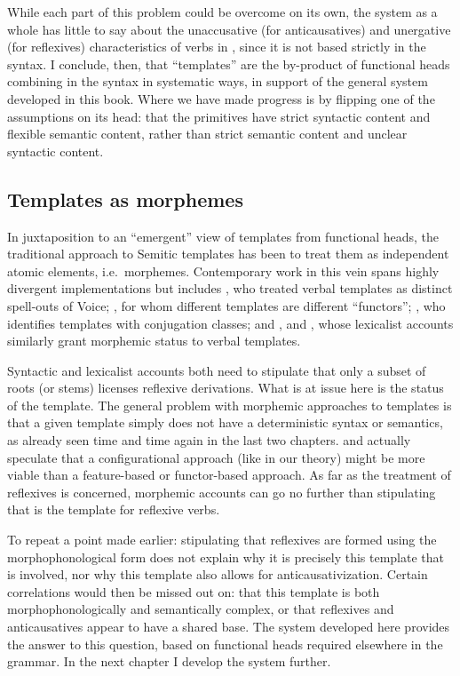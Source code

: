{{While each part of this problem could be overcome on its own, the system as a whole has little to say about the unaccusative (for anticausatives) and unergative (for reflexives) characteristics of verbs in {\thit}, since it is not based strictly in the syntax. I conclude, then, that ``templates'' are the by-product of functional heads combining in the syntax in systematic ways, in support of the general system developed in this book. Where we have made progress is by flipping one of the assumptions on its head: that the primitives have strict syntactic content and flexible semantic content, rather than strict semantic content and unclear syntactic content.

	\subsection{Templates as morphemes} \label{vz:others:morph}
In juxtaposition to an ``emergent'' view of templates from functional heads, the traditional approach to Semitic templates has been to treat them as independent atomic elements, i.e.~morphemes. Contemporary work in this vein spans highly divergent implementations but includes \cite{arad03,arad05}, who treated verbal templates as distinct spell-outs of Voice; \cite{borer13oup}, for whom different templates are different ``functors''; \cite{aronoff94,aronoff07}, who identifies templates with conjugation classes; and \cite{reinhartsiloni05}, \cite{schwarzwald08} and \cite{laks11,laks14}, whose lexicalist accounts similarly grant morphemic status to verbal templates.

Syntactic and lexicalist accounts both need to stipulate that only a subset of roots (or stems) licenses reflexive derivations. What is at issue here is the status of the template. The general problem with morphemic approaches to templates is that a given template simply does not have a deterministic syntax or semantics, as already seen time and time again in the last two chapters. \citet[198]{arad05} and \citet[564]{borer13oup} actually speculate that a configurational approach (like in our theory) might be more viable than a feature-based or functor-based approach. As far as the treatment of reflexives is concerned, morphemic accounts can go no further than stipulating that {\thit} is the template for reflexive verbs.

To repeat a point made earlier: stipulating that reflexives are formed using the morphophonological form {\thit} does not explain why it is precisely this template that is involved, nor why this template also allows for anticausativization. Certain correlations would then be missed out on: that this template is both morphophonologically and semantically complex, or that reflexives and anticausatives appear to have a shared base. The system developed here provides the answer to this question, based on functional heads required elsewhere in the grammar. In the next chapter I develop the system further.

}}
